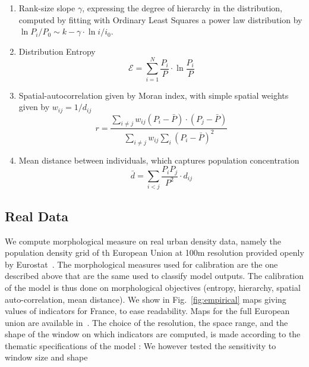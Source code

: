 \documentclass[10pt,letterpaper,draft]{article}
\begin{document}
\begin{enumerate}
\item Rank-size slope $\gamma$, expressing the degree of hierarchy in the distribution, computed by fitting with Ordinary Least Squares a power law distribution by $\ln{P_i/P_0} \sim k - \gamma\cdot \ln{i/i_0}$.
\item Distribution Entropy
\begin{equation}
\mathcal{E} = \sum_{i=1}^{N}\frac{P_i}{P}\cdot \ln{\frac{P_i}{P}}
\end{equation}
\item Spatial-autocorrelation given by Moran index, with simple spatial weights given by $w_{ij} = 1/d_{ij}$
\[
r = \frac{\sum_{i\neq j} w_{ij} \left(P_i - \bar{P}\right)\cdot\left(P_j - \bar{P}\right)}{\sum_{i\neq j} w_{ij} \sum_{i}{\left( P_i - \bar{P}\right)}^2}
\]
\item Mean distance between individuals, which captures population concentration
\[
\bar{d} = \sum_{i<j} \frac{P_i P_j}{P^2} \cdot d_{ij}
\]
\end{enumerate}






\subsection*{Real Data}



We compute morphological measure on real urban density data, namely the population density grid of th European Union at 100m resolution provided openly by Eurostat~\cite{eurostat}. The morphological measures used for calibration are the one described above that are the same used to classify model outputs. The calibration of the model is thus done on morphological objectives (entropy, hierarchy, spatial auto-correlation, mean distance). We show in Fig.~\ref{fig:empirical} maps giving values of indicators for France, to ease readability. Maps for the full European union are available in~. The choice of the resolution, the space range, and the shape of the window on which indicators are computed, is made according to the thematic specifications of the model : 
We however tested the sensitivity to window size and shape
\end{document}
